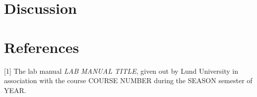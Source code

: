 \documentclass[a4, 12pt]{article}
\begin{document}






\section{Discussion}
\section{References}
[1] The lab manual \textit{LAB MANUAL TITLE}, given out by Lund University in association with the course COURSE NUMBER during the SEASON semester of YEAR. \newline \newline
\noindent 
\end{document}
